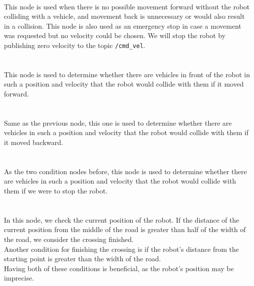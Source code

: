     \\
        This node is used when there is no possible movement forward without the robot colliding with a vehicle, and movement back is unnecessary or would also result in a collision. This node is also used as an emergency stop in case a movement was requested but no velocity could be chosen. We will stop the robot by publishing zero velocity to the topic \texttt{/cmd\_vel}.\\\\
    \\
        This node is used to determine whether there are vehicles in front of the robot in such a position and velocity that the robot would collide with them if it moved forward.\\\\
    \\
        Same as the previous node, this one is used to determine whether there are vehicles in such a position and velocity that the robot would collide with them if it moved backward.\\\\
    \\
        As the two condition nodes before, this node is used to determine whether there are vehicles in such a position and velocity that the robot would collide with them if we were to stop the robot.\\\\
    \\
        In this node, we check the current position of the robot. If the distance of the current position from the middle of the road is greater than half of the width of the road, we consider the crossing finished.\\
        Another condition for finishing the crossing is if the robot's distance from the starting point is greater than the width of the road.\\
        Having both of these conditions is beneficial, as the robot's position may be imprecise.
